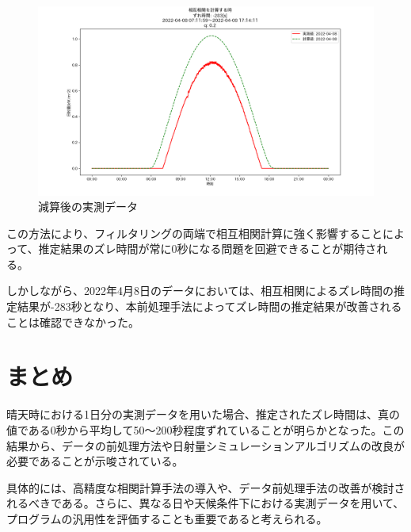 \documentclass[a4j,12pt,]{jarticle}
\begin{document}
\begin{figure}[H]
  \begin{center}
    \includegraphics[width=160mm]{10.png}
    \caption{減算後の実測データ}
    \label{p10}
  \end{center}
\end{figure}

この方法により、フィルタリングの両端で相互相関計算に強く影響することによって、推定結果のズレ時間が常に0秒になる問題を回避できることが期待される。

しかしながら、2022年4月8日のデータにおいては、相互相関によるズレ時間の推定結果が-283秒となり、本前処理手法によってズレ時間の推定結果が改善されることは確認できなかった。

\section{まとめ}
晴天時における1日分の実測データを用いた場合、推定されたズレ時間は、真の値である0秒から平均して50〜200秒程度ずれていることが明らかとなった。この結果から、データの前処理方法や日射量シミュレーションアルゴリズムの改良が必要であることが示唆されている。

具体的には、高精度な相関計算手法の導入や、データ前処理手法の改善が検討されるべきである。さらに、異なる日や天候条件下における実測データを用いて、プログラムの汎用性を評価することも重要であると考えられる。
\end{document}
